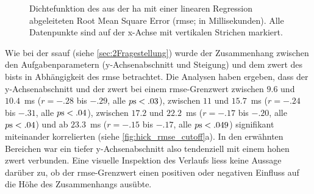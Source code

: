 \documentclass[11pt, twoside, a4paper]{book}		%
\begin{document}

\begin{figure}[t]
	\centering
	\begin{adjustbox}{width=1\textwidth}
		
	\end{adjustbox}
	\caption[Dichtefunktion des aus der \gls{ha} mit einer linearen Regression abgeleiteten \gls{rmse}]{Dichtefunktion des aus der \gls{ha} mit einer linearen Regression abgeleiteten Root Mean Square Error (\gls{rmse}; in Millisekunden).  Alle Datenpunkte sind auf der x-Achse mit vertikalen Strichen markiert.}
	\label{fig:hick_rmse_density}
\end{figure}

Wie bei der \gls{ssauf} (siehe \autoref{sec:2Fragestellung}) wurde der Zusammenhang zwischen den Aufgabenparametern (y-Achsenabschnitt und Steigung) und dem \gls{zwert} des \gls{bist}s in Abhängigkeit des \gls{rmse} betrachtet. Die Analysen haben ergeben, dass der y-Achsenabschnitt und der \gls{zwert} bei einem \gls{rmse}-Grenzwert zwischen $9.6$ und $10.4$~ms ($r = -.28$ bis $ -.29$, alle $p\textnormal{s} < .03$), zwischen $11$ und $15.7$~ms ($r = -.24$ bis $ -.31$, alle $p\textnormal{s} < .04$), zwischen $17.2$ und $22.2$~ms ($r = -.17$ bis $ -.20$, alle $p\textnormal{s} < .04$) und ab $23.3$~ms ($r = -.15$ bis $ -.17$, alle $p\textnormal{s} < .049$) signifikant miteinander korrelierten (siehe \autoref{fig:hick_rmse_cutoff}a). In den erwähnten Bereichen war ein tiefer y-Achsenabschnitt also tendenziell mit einem hohen \gls{zwert} verbunden. Eine visuelle Inspektion des Verlaufs liess keine Aussage darüber zu, ob der \gls{rmse}-Grenzwert einen positiven oder negativen Einfluss auf die Höhe des Zusammenhangs ausübte.
\end{document}
